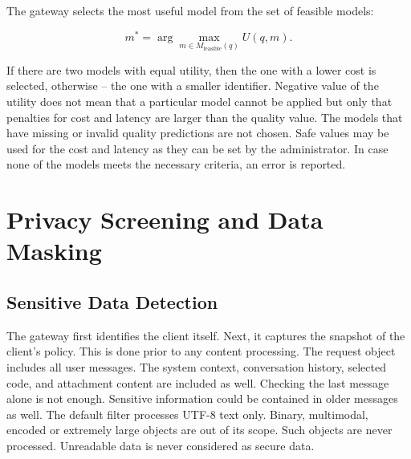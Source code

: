 \documentclass{FastFyp}
\begin{document}
The gateway selects the most useful model from the set of feasible models:

\begin{equation}
m^* =
\arg\max_{m\in M_{\text{feasible}}(q)} U(q,m).
\label{eq:model-selection}
\end{equation}

If there are two models with equal utility, then the one with a lower cost is selected, otherwise – the one with a smaller identifier. Negative value of the utility does not mean that a particular model cannot be applied but only that penalties for cost and latency are larger than the quality value.
The models that have missing or invalid quality predictions are not chosen. Safe values may be used for the cost and latency as they can be set by the administrator. In case none of the models meets the necessary criteria, an error is reported.

\section{Privacy Screening and Data Masking}
\label{sec:stage1-privacy}
\subsection{Sensitive Data Detection}
The gateway first identifies the client itself.
Next, it captures the snapshot of the client's policy.
This is done prior to any content processing.
The request object includes all user messages.
The system context, conversation history, selected code, and attachment content are included as well.
Checking the last message alone is not enough.
Sensitive information could be contained in older messages as well.
The default filter processes UTF-8 text only.
Binary, multimodal, encoded or extremely large objects are out of its scope.
Such objects are never processed.
Unreadable data is never considered as secure data.
\end{document}
